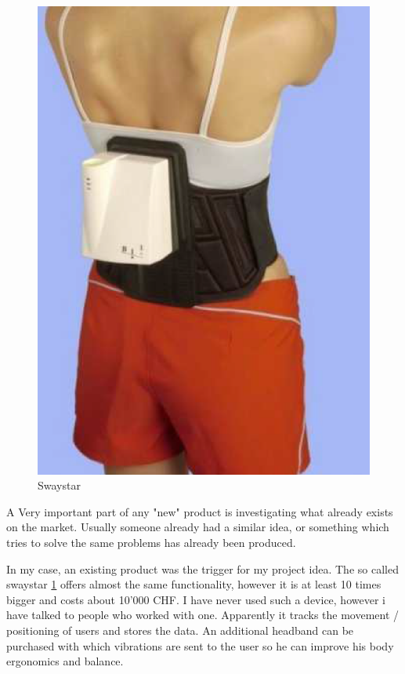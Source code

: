 \begin{figure}
  \begin{center}
\includegraphics[width=\linewidth]{images/Swaystar_01.png}
  \end{center}
  \caption{\label{fig:swaystar}Swaystar}
\end{figure}
A Very important part of any "new" product is investigating what already exists on the market.
Usually someone already had a similar idea, or something which tries to solve the same problems has already been produced. 

In my case, an existing product was the trigger for my project idea. The so called swaystar \ref{fig:swaystar} offers almost the same functionality, however it is at least 10 times bigger and costs about 10'000 CHF. 
I have never used such a device, however i have talked to people who worked with one. Apparently it tracks the movement / positioning of users and stores the data. An additional headband can be purchased with which vibrations are sent to the user so he can improve his body ergonomics and balance. 

